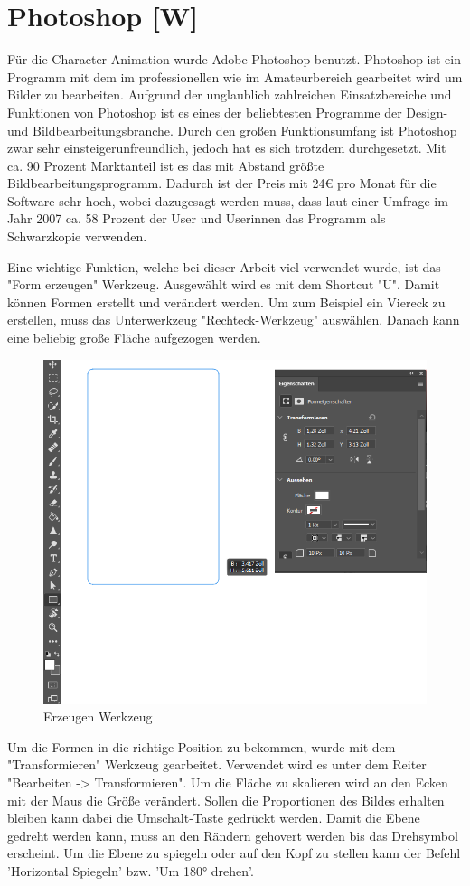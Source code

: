 \newpage
\section{Photoshop [W]}
Für die Character Animation wurde Adobe Photoshop benutzt. Photoshop ist ein Programm mit dem
im professionellen wie im Amateurbereich gearbeitet wird um Bilder zu bearbeiten.
Aufgrund der unglaublich zahlreichen Einsatzbereiche und Funktionen von Photoshop ist es
eines der beliebtesten Programme der Design- und Bildbearbeitungsbranche.
Durch den großen Funktionsumfang ist Photoshop zwar sehr einsteigerunfreundlich, jedoch
hat es sich trotzdem durchgesetzt. Mit ca. 90 Prozent Marktanteil ist es das mit Abstand größte
Bildbearbeitungsprogramm. Dadurch ist der Preis mit 24€ pro Monat für die Software sehr hoch, wobei dazugesagt werden muss,
dass laut einer Umfrage im Jahr 2007 ca. 58 Prozent der User und Userinnen das Programm als Schwarzkopie verwenden.

Eine wichtige Funktion, welche bei dieser Arbeit viel verwendet wurde, ist das "Form erzeugen" Werkzeug. Ausgewählt wird es mit dem Shortcut "U". Damit können Formen erstellt und verändert werden. Um zum Beispiel ein Viereck zu erstellen, muss das Unterwerkzeug "Rechteck-Werkzeug" auswählen. Danach
kann eine beliebig große Fläche aufgezogen werden.
\begin{figure}[H]
    \centering
    \includegraphics[scale=0.7]{pics/erzeugen.png}
    \caption{Erzeugen Werkzeug}
\end{figure}

Um die Formen in die richtige Position zu bekommen, wurde mit dem "Transformieren" Werkzeug
gearbeitet. Verwendet wird es unter dem Reiter "Bearbeiten -> Transformieren".
Um die Fläche zu skalieren wird an den Ecken mit der Maus die Größe verändert. Sollen die Proportionen des Bildes erhalten bleiben
kann dabei die Umschalt-Taste gedrückt werden. Damit die Ebene gedreht werden kann, muss an den Rändern gehovert werden bis das Drehsymbol erscheint.
Um die Ebene zu spiegeln oder auf den Kopf zu stellen kann der Befehl 'Horizontal Spiegeln' bzw. 'Um 180° drehen'.




